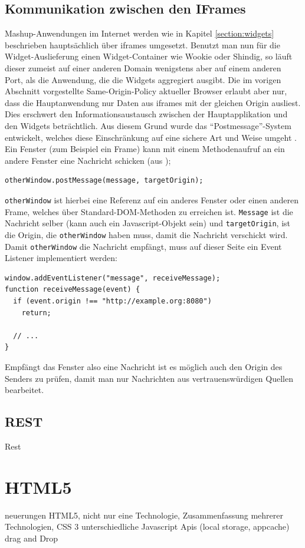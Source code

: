 \subsection{Kommunikation zwischen den IFrames}\label{section:kommunikation_zwischen_iframes}
Mashup-Anwendungen im Internet werden wie in Kapitel \ref{section:widgets} beschrieben hauptsächlich über iframes umgesetzt. Benutzt man nun für die Widget-Auslieferung einen Widget-Container wie Wookie oder Shindig, so läuft dieser zumeist auf einer anderen Domain wenigstens aber auf einem anderen Port, als die Anwendung, die die Widgets aggregiert ausgibt. Die im vorigen Abschnitt vorgestellte Same-Origin-Policy aktueller Browser erlaubt aber nur, dass die Hauptanwendung nur Daten aus iframes mit der gleichen Origin ausliest. Dies erschwert den Informationsaustausch zwischen der Hauptapplikation und den Widgets beträchtlich. Aus diesem Grund wurde das "`Postmessage"'-System entwickelt, welches diese Einschränkung auf eine sichere Art und Weise umgeht \cite{postmessage_mozilla}. Ein Fenster (zum Beispiel ein Frame) kann mit einem Methodenaufruf an ein andere Fenster eine Nachricht schicken (aus \cite{postmessage_mozilla});
\begin{lstlisting}
otherWindow.postMessage(message, targetOrigin);
\end{lstlisting}
\texttt{otherWindow} ist hierbei eine Referenz auf ein anderes Fenster oder einen anderen Frame, welches über Standard-DOM-Methoden zu erreichen ist. \texttt{Message} ist die Nachricht selber (kann auch ein Javascript-Objekt sein) und \texttt{targetOrigin}, ist die Origin, die \texttt{otherWindow} haben muss, damit die Nachricht verschickt wird. Damit \texttt{otherWindow} die Nachricht empfängt, muss auf dieser Seite ein Event Listener implementiert werden:
\begin{lstlisting}
window.addEventListener("message", receiveMessage);
function receiveMessage(event) {
  if (event.origin !== "http://example.org:8080")
    return;
 
  // ...
}
\end{lstlisting}
Empfängt das Fenster also eine Nachricht ist es möglich auch den Origin des Senders zu prüfen, damit man nur Nachrichten aus vertrauenswürdigen Quellen bearbeitet.

\subsection{REST}\label{section:rest}
Rest

\section{HTML5}\label{section:html5}
neuerungen HTML5, nicht nur eine Technologie, Zusammenfassung mehrerer Technologien, CSS 3 unterschiedliche Javascript Apis (local storage, appcache) drag and Drop

